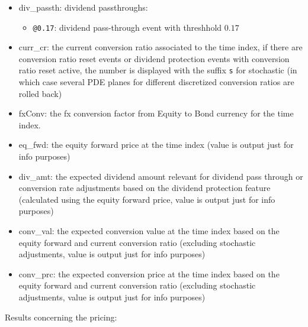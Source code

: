 {\begin{itemize}
\begin{itemize}
    conversion price
  \item \verb+0.8@0.9/CPT+ as before, but reference price is the current conversion price
  \item \verb+DP(i,0.23)@0.17+ dividend protection conversion ratio reset, relevant period starts at time index $i+1$,
    dividend yield over relevant period (without historical dividends) is $0.23$, threshold is $0.17$
  \end{itemize}
\item div\_passth: dividend passthroughs:
  \begin{itemize}
    \item \verb+@0.17+: dividend pass-through event with threshhold $0.17$
  \end{itemize}
\item curr\_cr: the current conversion ratio associated to the time index, if there are conversion ratio reset events or
  dividend protection events with conversion ratio reset active, the number is displayed with the suffix \verb+s+ for
  stochastic (in which case several PDE planes for different discretized conversion ratios are rolled back)
\item fxConv: the fx conversion factor from Equity to Bond currency for the time index.
\item eq\_fwd: the equity forward price at the time index (value is output just for info purposes)
\item div\_amt: the expected dividend amount relevant for dividend pass through or conversion rate adjustments based on
  the dividend protection feature (calculated using the equity forward price, value is output just for info purposes)
\item conv\_val: the expected conversion value at the time index based on the equity forward and current conversion
  ratio (excluding stochastic adjustments, value is output just for info purposes)
\item conv\_prc: the expected conversion price at the time index based on the equity forward and current conversion
  ratio (excluding stochastic adjustments, value is output just for info purposes)
\end{itemize}

Results concerning the pricing:

}
